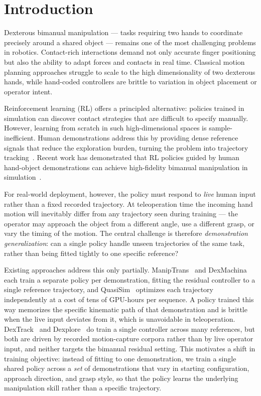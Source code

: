 \section{Introduction}

Dexterous bimanual manipulation --- tasks requiring two hands to coordinate precisely
around a shared object --- remains one of the most challenging problems in robotics.
Contact-rich interactions demand not only accurate finger positioning but also the ability to adapt forces and contacts in real time.
Classical motion planning approaches struggle to scale to the high dimensionality of
two dexterous hands, while hand-coded controllers are brittle to variation in object
placement or operator intent.
 
Reinforcement learning (RL) offers a principled alternative: policies trained in
simulation can discover contact strategies that are difficult to specify manually.
However, learning from scratch in such high-dimensional spaces is sample-inefficient.
Human demonstrations address this by providing dense reference signals that
reduce the exploration burden, turning the problem into trajectory
tracking~\cite{maniptrans, dexmachina, dextrack}.
Recent work has demonstrated that RL policies guided by human hand-object
demonstrations can achieve high-fidelity bimanual manipulation in
simulation~\cite{maniptrans}.
 
For real-world deployment, however, the policy must respond to \emph{live} human
input rather than a fixed recorded trajectory.
At teleoperation time the incoming hand motion will inevitably differ from any
trajectory seen during training --- the operator may approach the object from a
different angle, use a different grasp, or vary the timing of the motion.
The central challenge is therefore \emph{demonstration generalization}: can a single
policy handle unseen trajectories of the same task, rather than being fitted tightly
to one specific reference?
 
Existing approaches address this only partially.
ManipTrans~\cite{maniptrans} and DexMachina~\cite{dexmachina} each train a separate
policy per demonstration, fitting the residual controller to a single reference
trajectory, and QuasiSim~\cite{quasisim} optimizes each trajectory independently at a cost
of tens of GPU-hours per sequence.
A policy trained this way memorizes the specific kinematic path of that demonstration
and is brittle when the live input deviates from it, which is unavoidable in
teleoperation.
DexTrack~\cite{dextrack} and Dexplore~\cite{dexplore} do train a single controller across
many references, but both are driven by recorded motion-capture corpora rather than by live
operator input, and neither targets the bimanual residual setting.
This motivates a shift in training objective: instead of fitting to one demonstration,
we train a single shared policy across a \emph{set} of demonstrations that vary in
starting configuration, approach direction, and grasp style, so that the policy learns
the underlying manipulation skill rather than a specific trajectory.
 
